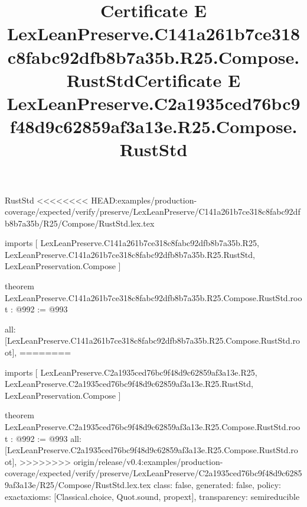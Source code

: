 \begin{lexlean}{RustStd}
<<<<<<<< HEAD:examples/production-coverage/expected/verify/preserve/LexLeanPreserve/C141a261b7ce318c8fabc92dfb8b7a35b/R25/Compose/RustStd.lex.tex
\title{Certificate E LexLeanPreserve.C141a261b7ce318c8fabc92dfb8b7a35b.R25.Compose.RustStd}
\begin{coremodule}
imports [
  LexLeanPreserve.C141a261b7ce318c8fabc92dfb8b7a35b.R25,
  LexLeanPreserve.C141a261b7ce318c8fabc92dfb8b7a35b.R25.RustStd,
  LexLeanPreservation.Compose
]

theorem LexLeanPreserve.C141a261b7ce318c8fabc92dfb8b7a35b.R25.Compose.RustStd.root : @992 := @993 {
  all: [LexLeanPreserve.C141a261b7ce318c8fabc92dfb8b7a35b.R25.Compose.RustStd.root],
========
\title{Certificate E LexLeanPreserve.C2a1935ced76bc9f48d9c62859af3a13e.R25.Compose.RustStd}
\begin{coremodule}
imports [
  LexLeanPreserve.C2a1935ced76bc9f48d9c62859af3a13e.R25,
  LexLeanPreserve.C2a1935ced76bc9f48d9c62859af3a13e.R25.RustStd,
  LexLeanPreservation.Compose
]

theorem LexLeanPreserve.C2a1935ced76bc9f48d9c62859af3a13e.R25.Compose.RustStd.root : @992 := @993 {
  all: [LexLeanPreserve.C2a1935ced76bc9f48d9c62859af3a13e.R25.Compose.RustStd.root],
>>>>>>>> origin/release/v0.4:examples/production-coverage/expected/verify/preserve/LexLeanPreserve/C2a1935ced76bc9f48d9c62859af3a13e/R25/Compose/RustStd.lex.tex
  class: false,
  generated: false,
  policy: exact{axioms: [Classical.choice, Quot.sound, propext]},
  transparency: semireducible
}


\end{coremodule}}
\end{coremodule}
\end{lexlean}
